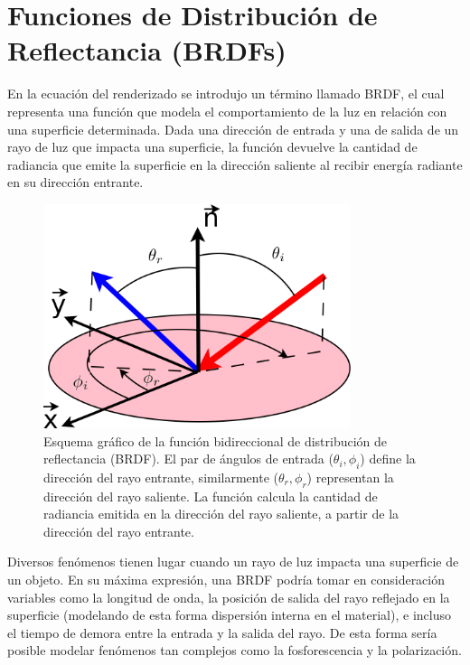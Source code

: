 \section{Funciones de Distribución de Reflectancia (BRDFs)}
En la ecuación del renderizado se introdujo un término llamado BRDF, el cual representa una función que modela el comportamiento de la luz en relación con una superficie determinada.
Dada una dirección de entrada y una de salida de un rayo de luz que impacta una superficie, la función devuelve la cantidad de radiancia que emite la superficie en la dirección saliente al recibir energía radiante en su dirección entrante.

\begin{figure}
\center
\includegraphics[width=9cm]{figures/brdf}
\caption[Esquema gráfico de la función bidireccional de distribución de reflectancia]{Esquema gráfico de la función bidireccional de distribución de reflectancia (BRDF). El par de ángulos de entrada ($\theta_{i},\phi_{i}$) define la dirección del rayo entrante, similarmente ($\theta_{r},\phi_{r}$) representan la dirección del rayo saliente. La función calcula la cantidad de radiancia emitida en la dirección del rayo saliente, a partir de la dirección del rayo entrante.}
\label{fg:brdf}
\end{figure}

Diversos fenómenos tienen lugar cuando un rayo de luz impacta una superficie de un objeto. En su máxima expresión, una BRDF podría tomar en consideración variables como la longitud de onda, la posición de salida del rayo reflejado en la superficie (modelando de esta forma dispersión interna en el material), e incluso el tiempo de demora entre la entrada y la salida del rayo.
De esta forma sería posible modelar fenómenos tan complejos como la fosforescencia y la polarización.

